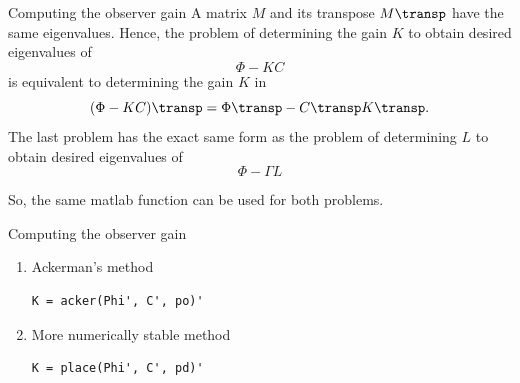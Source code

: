 \documentclass[presentation,aspectratio=1610]{beamer}
\begin{document}
\begin{frame}[label={sec:orgff3fa4d}]{Computing the observer gain}
A matrix \(M\) and its transpose \(M\transp\) have the same eigenvalues. Hence, the problem of determining the gain \(K\) to obtain desired eigenvalues of 
\[\Phi- KC\] is equivalent to determining the gain \(K\) in 
\[(\Phi-KC)\transp = \Phi\transp - C\transp K\transp.\]
The last problem has the exact same form as the problem of determining \(L\) to obtain desired eigenvalues of 
\[\Phi - \Gamma L\]

So, the same matlab function can be used for both problems.
\end{frame}

\begin{frame}[label={sec:org9d34dd5},fragile]{Computing the observer gain}
 \begin{enumerate}
\item \alert{Ackerman's method} 
\begin{verbatim}
K = acker(Phi', C', po)'
\end{verbatim}
\item \alert{More numerically stable method} 
\begin{verbatim}
K = place(Phi', C', pd)'
\end{verbatim}
\end{enumerate}
\end{frame}
\end{document}
